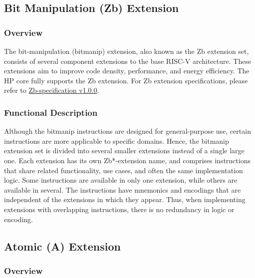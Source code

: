 \documentclass[main\_\_EN.tex]{subfiles}
\begin{document}

\newpage
\subsection{Bit Manipulation (Zb) Extension}
\label{sec:riscvcpu-zb}

\subsubsection{Overview}
\label{sec:riscvcpu-zb-overview}

The bit-manipulation (bitmanip) extension, also known as the Zb extension set, consists of several component extensions to the base RISC-V architecture. These extensions aim to improve code density, performance, and energy efficiency.  The HP core fully supports the Zb extension. For Zb extension specifications, please refer to \href{https://github.com/riscv/riscv-b}{Zb-specification v1.0.0}.

\subsubsection{Functional Description}
\label{sec:riscvcpu-zb-func-descr}

Although the bitmanip instructions are designed for general-purpose use, certain instructions are more applicable to specific domains. Hence, the bitmanip extension set is divided into several smaller extensions instead of a single large one. Each extension has its own Zb*-extension name, and comprises instructions that share related functionality, use cases, and often the same implementation logic. Some instructions are available in only one extension, while others are available in several. The instructions have mnemonics and encodings that are independent of the extensions in which they appear. Thus, when implementing extensions with overlapping instructions, there is no redundancy in logic or encoding.

\newpage


\newpage
\subsection{Atomic (A) Extension}
\label{sec:riscvcpu-atomic}

\subsubsection{Overview}
\label{sec:riscvcpu-atomic-overview}
\end{document}
